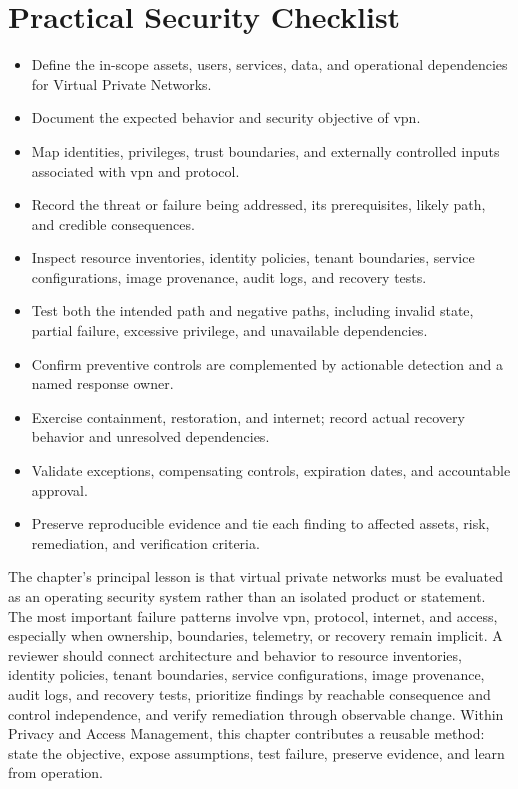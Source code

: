 \documentclass[11pt]{article}
\begin{document}
\section*{Practical Security Checklist}
\begin{itemize}[label=$\square$]
\item Define the in-scope assets, users, services, data, and operational dependencies for Virtual Private Networks.
\item Document the expected behavior and security objective of vpn.
\item Map identities, privileges, trust boundaries, and externally controlled inputs associated with vpn and protocol.
\item Record the threat or failure being addressed, its prerequisites, likely path, and credible consequences.
\item Inspect resource inventories, identity policies, tenant boundaries, service configurations, image provenance, audit logs, and recovery tests.
\item Test both the intended path and negative paths, including invalid state, partial failure, excessive privilege, and unavailable dependencies.
\item Confirm preventive controls are complemented by actionable detection and a named response owner.
\item Exercise containment, restoration, and internet; record actual recovery behavior and unresolved dependencies.
\item Validate exceptions, compensating controls, expiration dates, and accountable approval.
\item Preserve reproducible evidence and tie each finding to affected assets, risk, remediation, and verification criteria.
\end{itemize}
\begin{synthesisbox}
The chapter's principal lesson is that virtual private networks must be evaluated as an operating security system rather than an isolated product or statement. The most important failure patterns involve vpn, protocol, internet, and access, especially when ownership, boundaries, telemetry, or recovery remain implicit. A reviewer should connect architecture and behavior to resource inventories, identity policies, tenant boundaries, service configurations, image provenance, audit logs, and recovery tests, prioritize findings by reachable consequence and control independence, and verify remediation through observable change. Within Privacy and Access Management, this chapter contributes a reusable method: state the objective, expose assumptions, test failure, preserve evidence, and learn from operation.
\end{synthesisbox}
\end{document}
